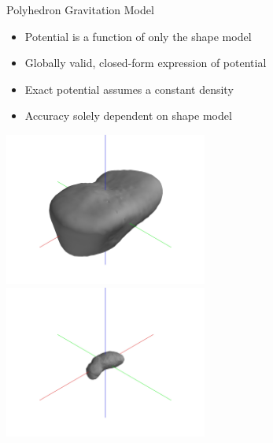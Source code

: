 \documentclass[11pt,professionalfonts,aspectratio=169]{beamer}
\begin{document}
\begin{frame}{Polyhedron Gravitation Model}

\begin{itemize}
    \item Potential is a function of only the shape model
    \item Globally valid, closed-form expression of potential
    \item Exact potential assumes a constant density 
    \item Accuracy solely dependent on shape model
\end{itemize}
\vspace*{-0.8cm}
\begin{center}
    \includegraphics[width=0.5\textwidth,keepaspectratio]{figures/castalia/partial_2047.jpg}~
    \includegraphics[width=0.5\textwidth,keepaspectratio]{figures/itokawa/partial_25349.jpg}
\end{center}
\end{frame}
\end{document}
